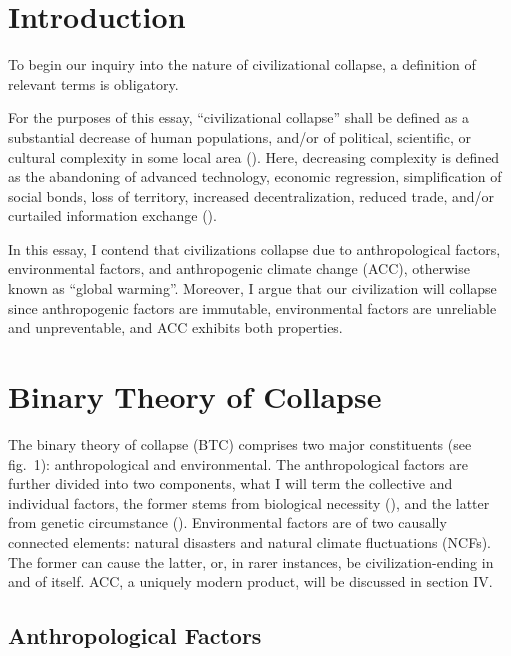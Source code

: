 \documentclass[12pt, a4paper, twoside]{article}
\begin{document}
\maketitle{}

\section{Introduction}

To begin our inquiry into the nature of civilizational collapse, a definition of relevant terms is obligatory. 

For the purposes of this essay, “civilizational collapse” shall be defined as a substantial decrease of human populations, and/or of political, scientific, or cultural complexity in some local area (\cite[p.\ 363]{diamond1994ecological}). Here, decreasing complexity is defined as the abandoning of advanced technology, economic regression, simplification of social bonds, loss of territory, increased decentralization, reduced trade, and/or curtailed information exchange (\cites[chap.\ 1]{tainter1988collapse}{tainter2023lecture}).

In this essay, I contend that civilizations collapse due to anthropological factors, environmental factors, and anthropogenic climate change (ACC), otherwise known as “global warming”. Moreover, I argue that our civilization will collapse since anthropogenic factors are immutable, environmental factors are unreliable and unpreventable, and ACC exhibits both properties. 

\section{Binary Theory of Collapse}

The binary theory of collapse (BTC) comprises two major constituents (see fig.\ 1): anthropological and environmental. The anthropological factors are further divided into two components, what I will term the collective and individual factors, the former stems from biological necessity (\cite[p.\ 13]{santos2015evolutionary}), and the latter from genetic circumstance (\cites[p.\ 8]{goriounova2019genes}[pp.\ 1–3]{wu2020genetic}). Environmental factors are of two causally connected elements: natural disasters and natural climate fluctuations (NCFs). The former can cause the latter, or, in rarer instances, be civilization-ending in and of itself. ACC, a uniquely modern product, will be discussed in section IV. 

\subsection{Anthropological Factors}
\end{document}
